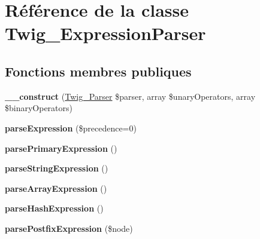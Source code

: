 \hypertarget{class_twig___expression_parser}{}\section{Référence de la classe Twig\+\_\+\+Expression\+Parser}
\label{class_twig___expression_parser}
\subsection*{Fonctions membres publiques}
\begin{DoxyCompactItemize}
\item 
{\bfseries \+\_\+\+\_\+construct} (\hyperlink{class_twig___parser}{Twig\+\_\+\+Parser} \$parser, array \$unary\+Operators, array \$binary\+Operators)\hypertarget{class_twig___expression_parser_ab976f2623fcf3bfe631ecfed19139d61}{}\label{class_twig___expression_parser_ab976f2623fcf3bfe631ecfed19139d61}

\item 
{\bfseries parse\+Expression} (\$precedence=0)\hypertarget{class_twig___expression_parser_a7071b8b73762e33627251e6515b0fe20}{}\label{class_twig___expression_parser_a7071b8b73762e33627251e6515b0fe20}

\item 
{\bfseries parse\+Primary\+Expression} ()\hypertarget{class_twig___expression_parser_af4649c23ab84785567030a0673a9ee76}{}\label{class_twig___expression_parser_af4649c23ab84785567030a0673a9ee76}

\item 
{\bfseries parse\+String\+Expression} ()\hypertarget{class_twig___expression_parser_a99a1301121a1b6e34fb7ce044baef1cf}{}\label{class_twig___expression_parser_a99a1301121a1b6e34fb7ce044baef1cf}

\item 
{\bfseries parse\+Array\+Expression} ()\hypertarget{class_twig___expression_parser_ac8125f8f7746662e24757a1207fe9986}{}\label{class_twig___expression_parser_ac8125f8f7746662e24757a1207fe9986}

\item 
{\bfseries parse\+Hash\+Expression} ()\hypertarget{class_twig___expression_parser_aa1ab124f21f6eb72bdda3f835a747237}{}\label{class_twig___expression_parser_aa1ab124f21f6eb72bdda3f835a747237}

\item 
{\bfseries parse\+Postfix\+Expression} (\$node)\hypertarget{class_twig___expression_parser_ad6aaf1c175652606d37f74ef5e008664}{}\label{class_twig___expression_parser_ad6aaf1c175652606d37f74ef5e008664}


\end{DoxyCompactItemize}

